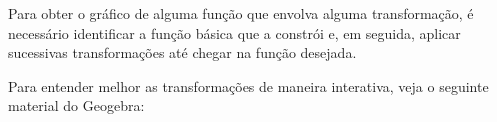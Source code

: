 
Para obter o gráfico de alguma função que envolva alguma transformação, é necessário identificar a função básica que a constrói e, em seguida, aplicar sucessivas transformações até chegar na função desejada.

Para entender melhor as transformações de maneira interativa, veja o seguinte material do Geogebra:






